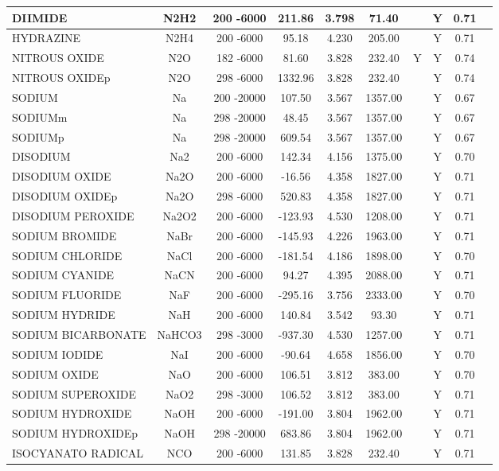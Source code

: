 \begin{longtable}{@{\extracolsep{\fill}}|l|c|c|c|c|c|c|c|c|l|}
DIIMIDE&N2H2&200 -6000&  211.86& 3.798&    71.40& &Y& 0.71&\\ \hline
HYDRAZINE&N2H4&200 -6000&   95.18& 4.230&   205.00& &Y& 0.71&\\ \hline
NITROUS OXIDE&N2O&182 -6000&   81.60& 3.828&   232.40&Y&Y& 0.74&\\ \hline
NITROUS OXIDEp&N2O&298 -6000& 1332.96& 3.828&   232.40& &Y& 0.74&\\ \hline
SODIUM&Na&200 -20000&  107.50& 3.567&  1357.00& &Y& 0.67&\\ \hline
SODIUMm&Na&298 -20000&   48.45& 3.567&  1357.00& &Y& 0.67&\\ \hline
SODIUMp&Na&298 -20000&  609.54& 3.567&  1357.00& &Y& 0.67&\\ \hline
DISODIUM&Na2&200 -6000&  142.34& 4.156&  1375.00& &Y& 0.70&\\ \hline
DISODIUM OXIDE&Na2O&200 -6000&  -16.56& 4.358&  1827.00& &Y& 0.71&\\ \hline
DISODIUM OXIDEp&Na2O&298 -6000&  520.83& 4.358&  1827.00& &Y& 0.71&\\ \hline
DISODIUM PEROXIDE&Na2O2&200 -6000& -123.93& 4.530&  1208.00& &Y& 0.71&\\ \hline
SODIUM BROMIDE&NaBr&200 -6000& -145.93& 4.226&  1963.00& &Y& 0.71&\\ \hline
SODIUM CHLORIDE&NaCl&200 -6000& -181.54& 4.186&  1898.00& &Y& 0.70&\\ \hline
SODIUM CYANIDE&NaCN&200 -6000&   94.27& 4.395&  2088.00& &Y& 0.71&\\ \hline
SODIUM FLUORIDE&NaF&200 -6000& -295.16& 3.756&  2333.00& &Y& 0.70&\\ \hline
SODIUM HYDRIDE&NaH&200 -6000&  140.84& 3.542&    93.30& &Y& 0.71&\\ \hline
SODIUM BICARBONATE&NaHCO3&298 -3000& -937.30& 4.530&  1257.00& &Y& 0.71&\\ \hline
SODIUM IODIDE&NaI&200 -6000&  -90.64& 4.658&  1856.00& &Y& 0.70&\\ \hline
SODIUM OXIDE&NaO&200 -6000&  106.51& 3.812&   383.00& &Y& 0.70&\\ \hline
SODIUM SUPEROXIDE&NaO2&298 -3000&  106.52& 3.812&   383.00& &Y& 0.71&\\ \hline
SODIUM HYDROXIDE&NaOH&200 -6000& -191.00& 3.804&  1962.00& &Y& 0.71&\\ \hline
SODIUM HYDROXIDEp&NaOH&298 -20000&  683.86& 3.804&  1962.00& &Y& 0.71&\\ \hline
ISOCYANATO RADICAL&NCO&200 -6000&  131.85& 3.828&   232.40& &Y& 0.71&\\ \hline

\end{longtable}
